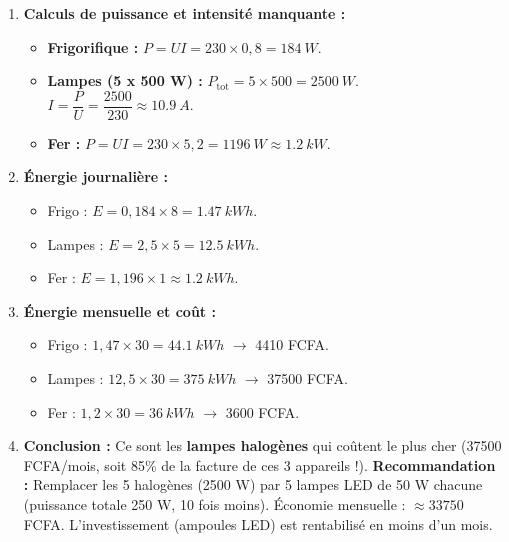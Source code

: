 \documentclass[11pt]{article}
\begin{document}
\begin{corrige}
\begin{enumerate}
\item \textbf{Calculs de puissance et intensité manquante :}
\begin{itemize}
\item \textbf{Frigorifique :} $P = U I = 230 \times 0,8 = \SI{184}{W}$.
\item \textbf{Lampes (5 x 500 W) :} $P_{\text{tot}} = 5 \times 500 = \SI{2500}{W}$. $I = \dfrac{P}{U} = \dfrac{2500}{230} \approx \SI{10,9}{A}$.
\item \textbf{Fer :} $P = U I = 230 \times 5,2 = \SI{1196}{W} \approx \SI{1,2}{kW}$.
\end{itemize}
\item \textbf{Énergie journalière :}
\begin{itemize}
\item Frigo : $E = 0,184 \times 8 = \SI{1,47}{kWh}$.
\item Lampes : $E = 2,5 \times 5 = \SI{12,5}{kWh}$.
\item Fer : $E = 1,196 \times 1 \approx \SI{1,2}{kWh}$.
\end{itemize}
\item \textbf{Énergie mensuelle et coût :}
\begin{itemize}
\item Frigo : $1,47 \times 30 = \SI{44,1}{kWh}$ $\to$ \num{4410} FCFA.
\item Lampes : $12,5 \times 30 = \SI{375}{kWh}$ $\to$ \num{37500} FCFA.
\item Fer : $1,2 \times 30 = \SI{36}{kWh}$ $\to$ \num{3600} FCFA.
\end{itemize}
\item \textbf{Conclusion :} Ce sont les \textbf{lampes halogènes} qui coûtent le plus cher (\num{37500} FCFA/mois, soit 85\% de la facture de ces 3 appareils !).
\textbf{Recommandation :} Remplacer les 5 halogènes (2500 W) par 5 lampes LED de 50 W chacune (puissance totale 250 W, 10 fois moins). Économie mensuelle : $\approx \num{33750}$ FCFA. L'investissement (ampoules LED) est rentabilisé en moins d'un mois.
\end{enumerate}
\end{corrige}
\end{document}
